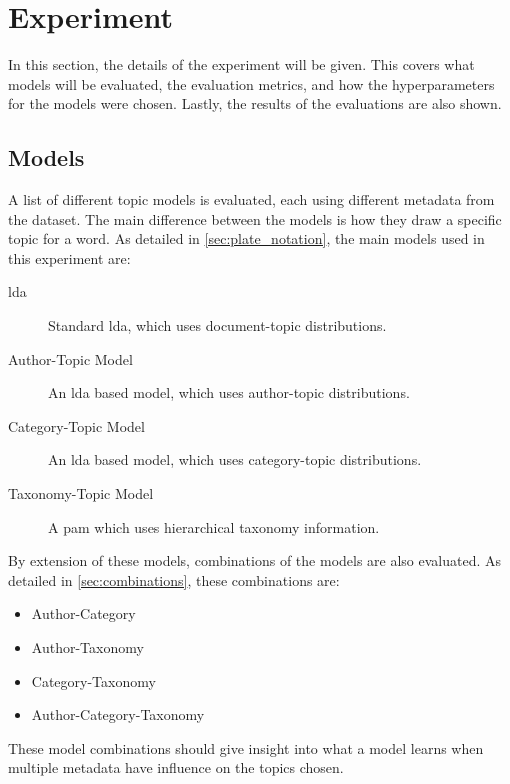 \section{Experiment}\label{sec:experiment}
In this section, the details of the experiment will be given.
This covers what models will be evaluated, the evaluation metrics, and how the hyperparameters for the models were chosen.
Lastly, the results of the evaluations are also shown.

\subsection{Models}\label{sec:experiment_models}
A list of different topic models is evaluated, each using different metadata from the dataset.
The main difference between the models is how they draw a specific topic for a word.
As detailed in \autoref{sec:plate_notation}, the main models used in this experiment are:
\begin{description}
	\item[\Acrlong{lda}] Standard \gls{lda}, which uses document-topic distributions.
	\item[Author-Topic Model] An \gls{lda} based model, which uses author-topic distributions.
	\item[Category-Topic Model] An \gls{lda} based model, which uses category-topic distributions.
	\item[Taxonomy-Topic Model] A \acrlong{pam} which uses hierarchical taxonomy information.
\end{description}

By extension of these models, combinations of the models are also evaluated.
As detailed in \autoref{sec:combinations}, these combinations are:
\begin{itemize}
	\item Author-Category
	\item Author-Taxonomy
	\item Category-Taxonomy
	\item Author-Category-Taxonomy
\end{itemize}
These model combinations should give insight into what a model learns when multiple metadata have influence on the topics chosen.

